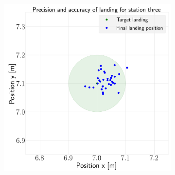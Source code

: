 \documentclass[../Head/report.tex]{subfiles}
\begin{document}
\begin{figure}[H]
\begin{subfigure}[t]{.30\textwidth}
        \caption{}
        \label{fig:vision_based_landing_landing_station_two_test4}
    \end{subfigure}
     \hspace{0.2em}
    \begin{subfigure}[t]{.30\textwidth}
        \centering
        \includegraphics[width=\textwidth]{../Figures/landing_test/test4_speed_0.1_error_0.05/landing_for_station_three.png}
        \caption{}
        \label{fig:vision_based_landing_landing_station_three_test4}
    \end{subfigure}
    \caption{}
    \label{fig:vision_based_landing_test4}
\end{figure}
\end{document}
